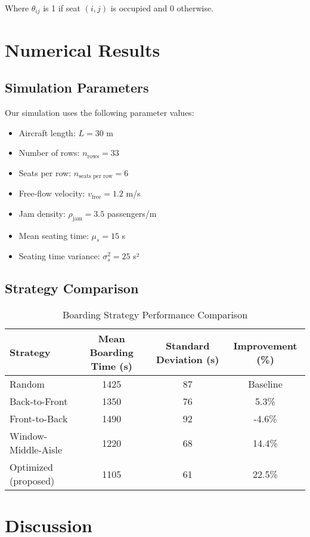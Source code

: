 \documentclass[a4paper,12pt]{article}
\begin{document}
Where $\theta_{ij}$ is 1 if seat $(i,j)$ is occupied and 0 otherwise.

\section{Numerical Results}
\subsection{Simulation Parameters}

Our simulation uses the following parameter values:
\begin{itemize}
    \item Aircraft length: $L = 30$ m
    \item Number of rows: $n_{\text{rows}} = 33$
    \item Seats per row: $n_{\text{seats per row}} = 6$
    \item Free-flow velocity: $v_{\text{free}} = 1.2$ m/s
    \item Jam density: $\rho_{\text{jam}} = 3.5$ passengers/m
    \item Mean seating time: $\mu_s = 15$ s
    \item Seating time variance: $\sigma_s^2 = 25$ s²
\end{itemize}

\subsection{Strategy Comparison}

\begin{table}[htbp]
\centering
\caption{Boarding Strategy Performance Comparison}
\label{tab:strategy_comparison}
\begin{tabular}{lccc}
\toprule
\textbf{Strategy} & \textbf{Mean Boarding Time (s)} & \textbf{Standard Deviation (s)} & \textbf{Improvement (\%)} \\
\midrule
Random & 1425 & 87 & Baseline \\
Back-to-Front & 1350 & 76 & 5.3\% \\
Front-to-Back & 1490 & 92 & -4.6\% \\
Window-Middle-Aisle & 1220 & 68 & 14.4\% \\
Optimized (proposed) & 1105 & 61 & 22.5\% \\
\bottomrule
\end{tabular}
\end{table}

\section{Discussion}
\end{document}
